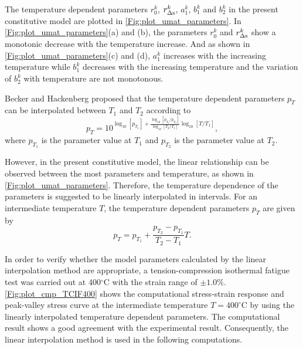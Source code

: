 The temperature dependent parameters $r_0^k$, $r_{\Delta \rm{s}}^k$, $a_1^k$, $b_1^k$ and $b_2^k$ in the present constitutive model are plotted in \ref{Fig:plot_umat_parameters}. In \ref{Fig:plot_umat_parameters}(a) and (b), the parameters $r_0^k$ and $r_{\Delta \rm{s}}^k$ show a monotonic decrease with the temperature increase. And as shown in \ref{Fig:plot_umat_parameters}(c) and (d), $a_1^k$ increases with the increasing temperature while $b_1^k$ decreases with the increasing temperature and the variation of $b_2^k$ with temperature are not monotonous.

Becker and Hackenberg \cite{Becker2011596} proposed that the temperature dependent parameters $p_T$ can be interpolated between $T_1$ and $T_2$ according to
\begin{equation}
p_T = {10^{{{\log }_{10}}\left[ {{p_{{T_1}}}} \right] + \frac{{{{\log }_{10}}\left[ {{p_{{T_1}}}/{p_{{T_2}}}} \right]}}{{{{\log }_{10}}\left[ {{T_2}/{T_1}} \right]}}{{\log }_{10}}\left[ {T/{T_1}} \right]}},
\end{equation}
where ${{p_{{T_1}}}}$ is the parameter value at $T_1$ and ${{p_{{T_2}}}}$ is the parameter value at $T_2$.

However, in the present constitutive model, the linear relationship can be observed between the most parameters and temperature, as shown in \ref{Fig:plot_umat_parameters}. Therefore, the temperature dependence of the parameters is suggested to be linearly interpolated in intervals. For an intermediate temperature $T$, the temperature dependent parameters $p_T$ are given by
\begin{equation}
{p_T} = {p_{{T_1}}} + \frac{{{p_{{T_2}}} - {p_{{T_1}}}}}{{{T_2} - {T_1}}}{T}.
\end{equation}

In order to verify whether the model parameters calculated by the linear interpolation method are appropriate, a tension-compression isothermal fatigue test was carried out at 400$^\circ$C with the strain range of $\pm1.0\%$.
\ref{Fig:plot_cmp_TCIF400} shows the computational stress-strain response and peak-valley stress curve at the intermediate temperature $T=400^\circ$C by using the linearly interpolated temperature dependent parameters. The computational result shows a good agreement with the experimental result. Consequently, the linear interpolation method is used in the following computations.


